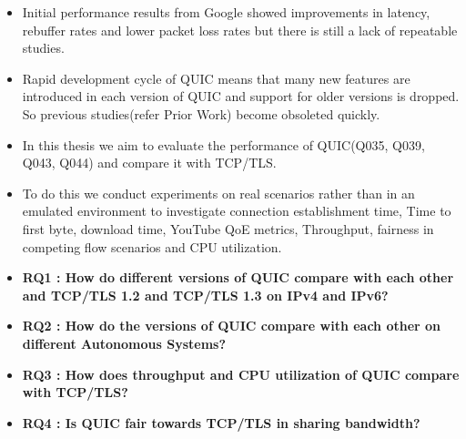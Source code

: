 \begin{frame}
\begin{itemize}
    \itemsep2em
    \item Initial performance results from Google showed improvements in latency, rebuffer rates and lower packet loss rates but there is still a lack
    of repeatable studies.
    
    \item Rapid development cycle of QUIC means
    that many new features are introduced in each version of QUIC and support for older
    versions is dropped. So previous studies(refer Prior Work) become obsoleted quickly.
    
    \item In this thesis we aim to evaluate the performance of QUIC(Q035, Q039, Q043, Q044) and compare it with
    TCP/TLS. 
    
    \item To do this we conduct experiments on real scenarios rather than in an emulated environment to investigate connection establishment time, Time to first byte, download time, YouTube QoE metrics, Throughput,
    fairness in competing flow scenarios and CPU utilization.
    
\end{itemize}
\end{frame}
\clearpage

\begin{frame}
    \begin{itemize}
        \itemsep3em 
        \item\textbf{RQ1 : How do different versions of QUIC compare with each other and TCP/TLS 1.2 and TCP/TLS 1.3 on IPv4 and IPv6?}
        
        \item\textbf{RQ2 : How do the versions of QUIC compare with each other on different Autonomous Systems?}

        \item\textbf{RQ3 : How does throughput and CPU utilization of QUIC compare with TCP/TLS?}
        
        
        \item\textbf{RQ4 : Is QUIC fair towards TCP/TLS in sharing bandwidth?}
        
    \end{itemize}
\end{frame}
\clearpage



